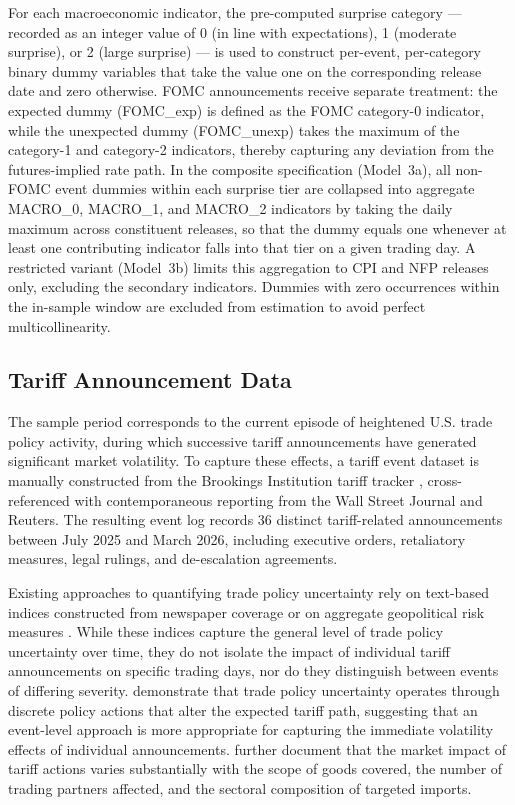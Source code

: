 For each macroeconomic indicator, the pre-computed surprise category --- recorded as an integer value of 0 (in line with expectations), 1 (moderate surprise), or 2 (large surprise) --- is used to construct per-event, per-category binary dummy variables that take the value one on the corresponding release date and zero otherwise. FOMC announcements receive separate treatment: the expected dummy (FOMC\_exp) is defined as the FOMC category-0 indicator, while the unexpected dummy (FOMC\_unexp) takes the maximum of the category-1 and category-2 indicators, thereby capturing any deviation from the futures-implied rate path. In the composite specification (Model~3a), all non-FOMC event dummies within each surprise tier are collapsed into aggregate MACRO\_0, MACRO\_1, and MACRO\_2 indicators by taking the daily maximum across constituent releases, so that the dummy equals one whenever at least one contributing indicator falls into that tier on a given trading day. A restricted variant (Model~3b) limits this aggregation to CPI and NFP releases only, excluding the secondary indicators. Dummies with zero occurrences within the in-sample window are excluded from estimation to avoid perfect multicollinearity.

\subsection{Tariff Announcement Data}

The sample period corresponds to the current episode of heightened U.S. trade policy activity, during which successive tariff announcements have generated significant market volatility. To capture these effects, a tariff event dataset is manually constructed from the Brookings Institution tariff tracker \citep{Brookings2025}, cross-referenced with contemporaneous reporting from the Wall Street Journal and Reuters. The resulting event log records 36 distinct tariff-related announcements between July 2025 and March 2026, including executive orders, retaliatory measures, legal rulings, and de-escalation agreements.

Existing approaches to quantifying trade policy uncertainty rely on text-based indices constructed from newspaper coverage \citep{BakerBloomDavis2016} or on aggregate geopolitical risk measures \citep{CaldaraIacoviello2022}. While these indices capture the general level of trade policy uncertainty over time, they do not isolate the impact of individual tariff announcements on specific trading days, nor do they distinguish between events of differing severity. \citet{HandleyLimao2017} demonstrate that trade policy uncertainty operates through discrete policy actions that alter the expected tariff path, suggesting that an event-level approach is more appropriate for capturing the immediate volatility effects of individual announcements. \citet{FajgelbaumKhandelwal2022} further document that the market impact of tariff actions varies substantially with the scope of goods covered, the number of trading partners affected, and the sectoral composition of targeted imports.

